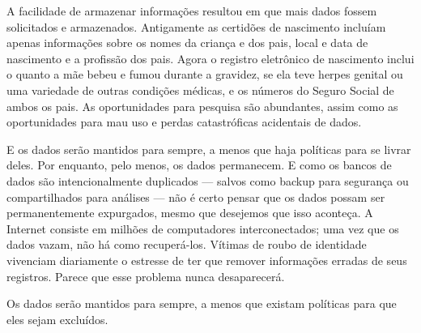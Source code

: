 A facilidade de armazenar informações resultou em que mais dados fossem
solicitados e armazenados. Antigamente as certidões de nascimento incluíam
apenas informações sobre os nomes da criança e dos pais, local e data de
nascimento e a profissão dos pais. Agora o registro eletrônico de nascimento
inclui o quanto a mãe bebeu e fumou durante a gravidez, se ela teve herpes
genital ou uma variedade de outras condições médicas, e os números do Seguro
Social de ambos os pais. As oportunidades para pesquisa são abundantes, assim
como as oportunidades para mau uso e perdas catastróficas acidentais de dados.

E os dados serão mantidos para sempre, a menos que haja políticas para se livrar
deles. Por enquanto, pelo menos, os dados permanecem. E como os bancos de dados
são intencionalmente duplicados --- salvos como backup para segurança ou
compartilhados para análises --- não é certo pensar que os dados possam ser
permanentemente expurgados, mesmo que desejemos que isso aconteça. A Internet
consiste em milhões de computadores interconectados; uma vez que os dados vazam,
não há como recuperá-los. Vítimas de roubo de identidade vivenciam diariamente o
estresse de ter que remover informações erradas de seus registros. Parece que
esse problema nunca desaparecerá.

\begin{tcolorbox}
Os dados serão mantidos para sempre, a menos que existam políticas para que eles
sejam excluídos.
\end{tcolorbox}

